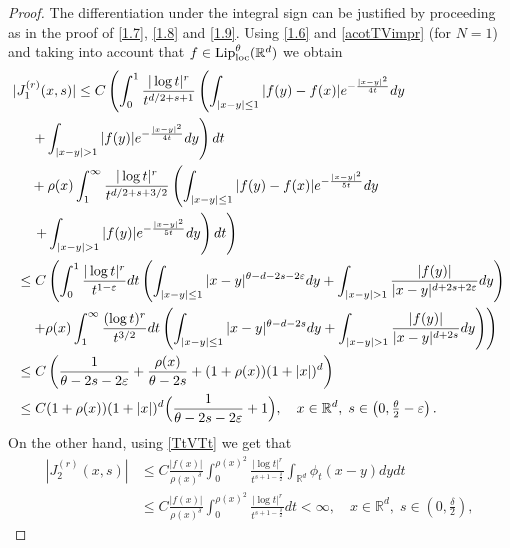 \documentclass[10pt, a4paper, reqno]{amsart}
\theoremstyle{definition}
\theoremstyle{remark}
\numberwithin{equation}{section}
\begin{document}
\begin{proof}
The differentiation under the integral sign can be justified by proceeding as in the proof of \eqref{1.7}, \eqref{1.8} and \eqref{1.9}.  Using \eqref{1.6} and  \eqref{acotTVimpr} (for $N=1$) and taking into account that $f\in {\textup{Lip}}^\theta _{\rm loc}(\mathbb R^d)$ we obtain
\begin{align*}
  |J_1^{(r)}(x,s)|&\leq C\left(\int_0^1\frac{|\log t|^r}{t^{d/2+s+1}}\left(\int_{|x-y|\leq 1}|f(y)-f(x)|e^{-\frac{|x-y|^2}{4t}}dy\right.\right.\\
  &\hspace{-1.5cm}\quad \left.+\int_{|x-y|>1}|f(y)|e^{-\frac{|x-y|^2}{4t}}dy\right)dt\\
 &\hspace{-1.5cm}\quad +\rho (x)\int_1^\infty \frac{|\log t|^r}{t^{d/2+s+3/2}}\left(\int_{|x-y|\leq 1}|f(y)-f(x)|e^{-\frac{|x-y|^2}{5t}}dy\right.\\
  &\hspace{-1.5cm}\quad \left.\left.+\int_{|x-y|>1}|f(y)|e^{-\frac{|x-y|^2}{5t}}dy\right)dt\right)\\
  &\hspace{-1.5cm}\leq C\left(\int_0^1\frac{|\log t|^r}{t^{1-\varepsilon}}dt\left(\int_{|x-y|\leq 1}|x-y|^{\theta -d-2s-2\varepsilon}dy+\int_{|x-y|>1}\frac{|f(y)|}{|x-y|^{d+2s+2\varepsilon}}dy\right)\right.\\
 &\hspace{-1.5cm}\left.\quad +\rho (x)\int_1^\infty \frac{(\log t)^r}{t^{3/2}}dt\left(\int_{|x-y|\leq 1}|x-y|^{\theta -d-2s}dy+\int_{|x-y|>1}\frac{|f(y)|}{|x-y|^{d+2s}}dy\right)\right)\\
  &\hspace{-1.5cm}\leq C\left(\frac{1}{\theta -2s-2\varepsilon}+\frac{\rho (x)}{\theta -2s}+(1+\rho (x))(1+|x|)^d\right)\\
  &\hspace{-1.5cm}\leq C(1+\rho (x))(1+|x|)^d\Big(\frac{1}{\theta -2s-2\varepsilon}+1\Big),\quad x\in \mathbb R^d,\;s\in \left(0,\tfrac{\theta}{2}-\varepsilon\right).
\end{align*}
On the other hand, using \eqref{TtVTt} we get that
\begin{align*}
    |J_2^{(r)}(x,s)|&\leq C\frac{|f(x)|}{\rho (x)^\delta}\int_0^{\rho (x)^2}\frac{|\log t|^r}{t^{s+1-\tfrac{\delta}{2}}}\int_{\mathbb R^d}\phi _t(x-y)dydt\\
    &\leq  C\frac{|f(x)|}{\rho (x)^\delta}\int_0^{\rho (x)^2}\frac{|\log t|^r}{t^{s+1-\tfrac{\delta}{2}}}dt<\infty,\quad x\in \mathbb R^d,\;s\in \left(0,\tfrac{\delta}{2}\right),

\end{align*}
\end{proof}
\end{document}
